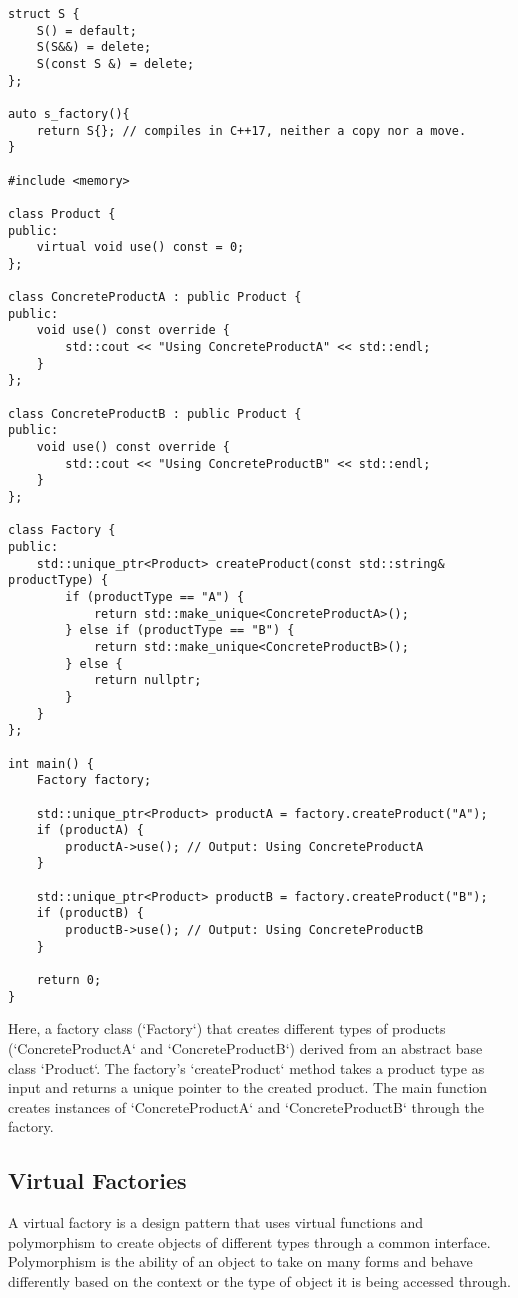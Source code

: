 \begin{verbatim}
struct S {
    S() = default;
    S(S&&) = delete;
    S(const S &) = delete;
};

auto s_factory(){
    return S{}; // compiles in C++17, neither a copy nor a move.
}

#include <memory>

class Product {
public:
    virtual void use() const = 0;
};

class ConcreteProductA : public Product {
public:
    void use() const override {
        std::cout << "Using ConcreteProductA" << std::endl;
    }
};

class ConcreteProductB : public Product {
public:
    void use() const override {
        std::cout << "Using ConcreteProductB" << std::endl;
    }
};

class Factory {
public:
    std::unique_ptr<Product> createProduct(const std::string& productType) {
        if (productType == "A") {
            return std::make_unique<ConcreteProductA>();
        } else if (productType == "B") {
            return std::make_unique<ConcreteProductB>();
        } else {
            return nullptr;
        }
    }
};

int main() {
    Factory factory;
    
    std::unique_ptr<Product> productA = factory.createProduct("A");
    if (productA) {
        productA->use(); // Output: Using ConcreteProductA
    }
    
    std::unique_ptr<Product> productB = factory.createProduct("B");
    if (productB) {
        productB->use(); // Output: Using ConcreteProductB
    }
    
    return 0;
}

\end{verbatim}

Here, a factory class (`Factory`) that creates different types of products
(`ConcreteProductA` and `ConcreteProductB`) derived from an abstract base class `Product`.
The factory's `createProduct` method takes a product type as input and returns a unique pointer to the created product.
The main function creates instances of `ConcreteProductA` and `ConcreteProductB` through the factory.

\subsection{Virtual Factories}
A virtual factory is a design pattern that uses virtual functions and 
polymorphism to create objects of different types through a common interface.
Polymorphism is the ability of an object to take on many forms
and behave differently based on the context or the type of object it is being accessed through.

